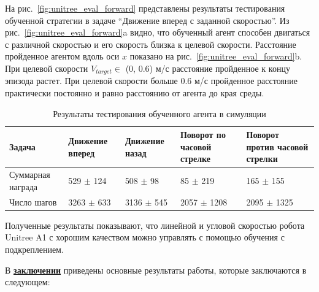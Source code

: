 На рис.~\ref{fig:unitree_eval_forward} представлены результаты тестирования обученной стратегии в задаче ``Движение вперед с заданной скоростью''. Из рис.~\ref{fig:unitree_eval_forward}a видно, что обученный агент способен двигаться с различной скоростью и его скорость близка к целевой скорости. Расстояние пройденное агентом вдоль оси $x$ показано на рис.~\ref{fig:unitree_eval_forward}b. При целевой скорости $V_{target} \in$ (0, 0.6) м/с расстояние пройденное к концу эпизода растет. При целевой скорости больше 0.6 м/с пройденное расстояние практически постоянно и равно расстоянию от агента до края среды.

\begin{table} [htbp]
    \centering
    \begin{threeparttable}
        \caption{Результаты тестирования обученного агента в симуляции}\label{tab:unitree_eval}
        \begin{tabular}{| p{2cm} || p{2cm} | p{2cm} | p{2cm} |p{2cm} |}
            \hline
            \hline
            Задача & Движение вперед & Движение назад & Поворот по часовой стрелке & Поворот против часовой стрелки \\
            \hline
            Суммарная награда &	529 $\pm$ 124 &	508 $\pm$ 98 &	85 $\pm$ 219 &	165 $\pm$ 155 \\
            Число шагов & 3263 $\pm$ 633 &	3136 $\pm$ 545 &	2057 $\pm$ 1208 &	2095 $\pm$ 1325 \\
            \hline
            \hline
        \end{tabular}
    \end{threeparttable}
\end{table}

Полученные результаты показывают, что линейной и угловой скоростью робота Unitree A1 с хорошим качеством можно управлять с помощью обучения с подкреплением. 



\FloatBarrier
{}                                  %
В \underline{\textbf{заключении}} приведены основные результаты работы, которые заключаются в следующем:



